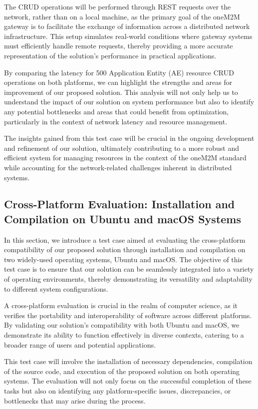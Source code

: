 \documentclass[a4paper,fleqn]{cas-dc}
\begin{document}
The CRUD operations will be performed through REST requests over the network, rather than on a local machine, as the primary goal of the oneM2M gateway is to facilitate the exchange of information across a distributed network infrastructure. This setup simulates real-world conditions where gateway systems must efficiently handle remote requests, thereby providing a more accurate representation of the solution's performance in practical applications.

By comparing the latency for 500 Application Entity (AE) resource CRUD operations on both platforms, we can highlight the strengths and areas for improvement of our proposed solution. This analysis will not only help us to understand the impact of our solution on system performance but also to identify any potential bottlenecks and areas that could benefit from optimization, particularly in the context of network latency and resource management.

The insights gained from this test case will be crucial in the ongoing development and refinement of our solution, ultimately contributing to a more robust and efficient system for managing resources in the context of the oneM2M standard while accounting for the network-related challenges inherent in distributed systems.

\subsection{Cross-Platform Evaluation: Installation and Compilation on Ubuntu and macOS Systems}

In this section, we introduce a test case aimed at evaluating the cross-platform compatibility of our proposed solution through installation and compilation on two widely-used operating systems, Ubuntu and macOS. The objective of this test case is to ensure that our solution can be seamlessly integrated into a variety of operating environments, thereby demonstrating its versatility and adaptability to different system configurations.

A cross-platform evaluation is crucial in the realm of computer science, as it verifies the portability and interoperability of software across different platforms. By validating our solution's compatibility with both Ubuntu and macOS, we demonstrate its ability to function effectively in diverse contexts, catering to a broader range of users and potential applications.

This test case will involve the installation of necessary dependencies, compilation of the source code, and execution of the proposed solution on both operating systems. The evaluation will not only focus on the successful completion of these tasks but also on identifying any platform-specific issues, discrepancies, or bottlenecks that may arise during the process.
\end{document}
